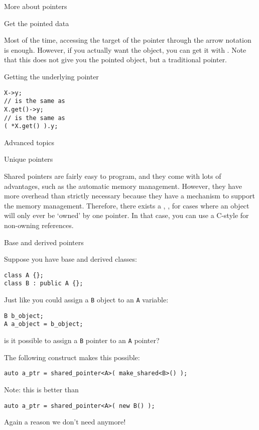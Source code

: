  {More about pointers}

 {Get the pointed data}

Most of the time, accessing the target of the pointer through the
arrow notation is enough. However, if you actually want the object,
you can get it with . Note that this does not give
you the pointed object, but a traditional pointer.

\begin{block}{Getting the underlying pointer}
  \label{sl:pointer-get}
\begin{lstlisting}
X->y;
// is the same as
X.get()->y;
// is the same as
( *X.get() ).y;
\end{lstlisting}

\end{block}

 {Advanced topics}

 {Unique pointers}

Shared pointers are fairly easy to program, and they come with lots of
advantages, such as the automatic memory management. However, they
have more overhead than strictly necessary because they have a
 mechanism to support the memory
management. Therefore, there exists a ,
, for cases where an object will only ever be
`owned' by one pointer. In that case, you can use a C-style
 for non-owning references.

 {Base and derived pointers}

Suppose you have base and derived classes:
\begin{lstlisting}
class A {};
class B : public A {};  
\end{lstlisting}
Just like you could assign a \lstinline{B} object to an \lstinline{A}
variable:
\begin{lstlisting}
B b_object;
A a_object = b_object;
\end{lstlisting}
is it possible to assign a \lstinline{B} pointer to an \lstinline{A}
pointer?

The following construct makes this possible:
\begin{lstlisting}
auto a_ptr = shared_pointer<A>( make_shared<B>() );
\end{lstlisting}

Note: this is better than
\begin{lstlisting}
auto a_ptr = shared_pointer<A>( new B() );
\end{lstlisting}
Again a reason we don't need  anymore!

